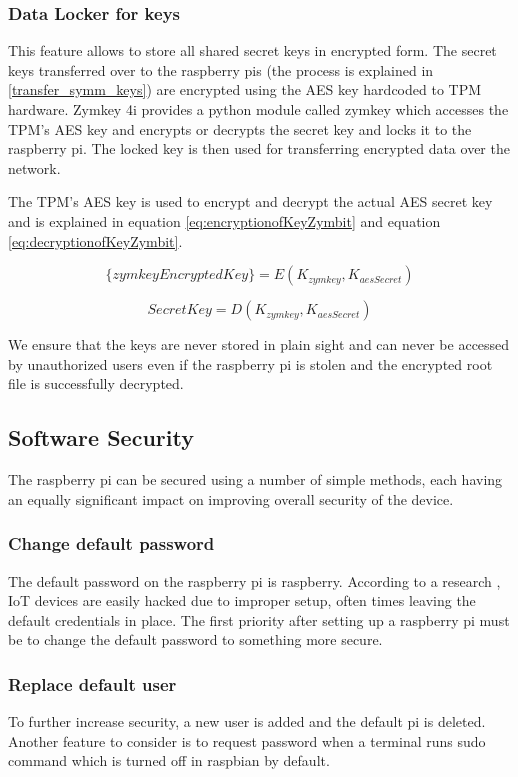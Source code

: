 \documentclass[11pt,openright]{report}
\begin{document}
\subsubsection{Data Locker for keys}
This feature allows to store all shared secret keys in encrypted form. The secret keys transferred over to the raspberry pis (the process is explained in \ref{transfer_symm_keys}) are encrypted using the AES key hardcoded to TPM hardware. Zymkey 4i provides a python module called zymkey which accesses the TPM's AES key and encrypts or decrypts the secret key and locks it to the raspberry pi. The locked key is then used for transferring encrypted data over the network.

The TPM's AES key is used to encrypt and decrypt the actual AES secret key and is explained in equation \ref{eq:encryptionofKeyZymbit} and equation \ref{eq:decryptionofKeyZymbit}.

\begin{equation} \label{eq:encryptionofKeyZymbit}
    \{zymkeyEncryptedKey\} =  E(K_{zymkey}, K_{aesSecret})
\end{equation}

\begin{equation} \label{eq:decryptionofKeyZymbit}
    SecretKey =  D(K_{zymkey}, K_{aesSecret})
\end{equation}

We ensure that the keys are never stored in plain sight and can never be accessed by unauthorized users even if the raspberry pi is stolen and the encrypted root file is successfully decrypted.

\subsection{Software Security}
The raspberry pi can be secured using a number of simple methods, each having an equally significant impact on improving overall security of the device.

\subsubsection{Change default password}
The default password on the raspberry pi is raspberry. According to a research \cite{8364059}, IoT devices are easily hacked due to improper setup, often times leaving the default credentials in place. The first priority after setting up a raspberry pi must be to change the default password to something more secure.

\subsubsection{Replace default user}
To further increase security, a new user is added and the default pi is deleted. Another feature to consider is to request password when a terminal runs sudo command which is turned off in raspbian by default.
\end{document}
